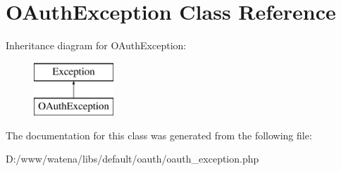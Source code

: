 \hypertarget{class_o_auth_exception}{\section{O\-Auth\-Exception Class Reference}
\label{class_o_auth_exception}
}
Inheritance diagram for O\-Auth\-Exception\-:\begin{figure}[H]
\begin{center}
\leavevmode
\includegraphics[height=2.000000cm]{class_o_auth_exception}
\end{center}
\end{figure}


The documentation for this class was generated from the following file\-:\begin{DoxyCompactItemize}
\item 
D\-:/www/watena/libs/default/oauth/oauth\-\_\-exception.\-php\end{DoxyCompactItemize}
